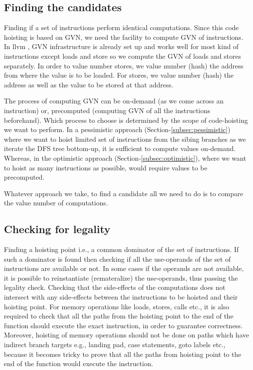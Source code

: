 \documentclass{sig-alternate}
\begin{document}
\subsection{Finding the candidates}
Finding if a set of instructions perform identical computations. Since this code
hoisting is based on GVN, we need the facility to compute GVN of instructions.
In llvm \cite{llvm}, GVN infrastructure is already set up and works well for
most kind of instructions except loads and store so we compute the GVN of loads
and stores separately. In order to value number stores, we value number (hash)
the address from where the value is to be loaded. For stores, we value number
(hash) the address as well as the value to be stored at that address.

The process of computing GVN can be on-demand (as we come across an instruction)
or, precomputed (computing GVN of all the instructions beforehand). Which
process to choose is determined by the scope of code-hoisting we want to
perform. In a pessimistic approach (Section-\ref{subsec:pessimistic}) where we
want to hoist limited set of instructions from the sibing branches as we iterate
the DFS tree bottom-up, it is sufficient to compute values on-demand. Whereas,
in the optimistic approach (Section-\ref{subsec:optimistic}), where we want to
hoist as many instructions as possible, would require values to be precomputed.

Whatever approach we take, to find a candidate all we need to do is to compare
the value number of computations.

\subsection{Checking for legality}
Finding a hoisting point i.e., a common dominator of the set of instructions. If
such a dominator is found then checking if all the use-operands of the set of
instructions are available or not. In some cases if the operands are not
available, it is possible to reinstantiate (remateralize) the use-operands, thus
passing the legality check. Checking that the side-effects of the computations
does not intersect with any side-effects between the instructions to be hoisted
and their hoisting point. For memory operations like loads, stores, calls etc.,
it is also required to check that all the paths from the hoisting point to the
end of the function should execute the exact instruction, in order to guarantee
correctness. Moreover, hoisting of memory operations should not be done on paths
which have indirect branch targets e.g., landing pad, case statements, goto
labels etc., because it becomes tricky to prove that all the paths from hoisting
point to the end of the function would execute the instruction.
\end{document}
